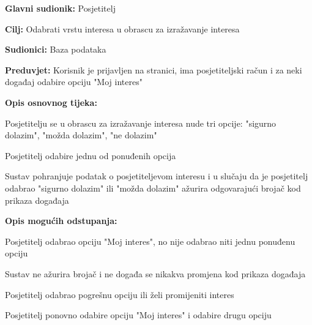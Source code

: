 					\noindent {}
\begin{packed_item}
	\item \textbf{Glavni sudionik:} Posjetitelj
	\item  \textbf{Cilj:} Odabrati vrstu interesa u obrascu za izražavanje interesa
	\item  \textbf{Sudionici:} Baza podataka
	\item  \textbf{Preduvjet:} Korisnik je prijavljen na stranici, ima posjetiteljski račun i za neki događaj odabire opciju "Moj interes"
	\item  \textbf{Opis osnovnog tijeka:}
	
	\item[] \begin{packed_enum}
		
		\item Posjetitelju se u obrascu za izražavanje interesa nude tri opcije: "sigurno dolazim", "možda dolazim", "ne dolazim"
		\item Posjetitelj odabire jednu od ponuđenih opcija
		\item Sustav pohranjuje podatak o posjetiteljevom interesu i u slučaju da je posjetitelj odabrao "sigurno dolazim" ili "možda dolazim" ažurira odgovarajući brojač kod prikaza događaja
	\end{packed_enum}
	
	\item  \textbf{Opis mogućih odstupanja:}
	
	\item[] \begin{packed_item}
		
		\item[2.a] Posjetitelj odabrao opciju "Moj interes", no nije odabrao niti jednu ponuđenu opciju
		\item[] \begin{packed_enum}
			
			\item Sustav ne ažurira brojač i ne događa se nikakva promjena kod prikaza događaja
			
		\end{packed_enum}
		\item[2.b] Posjetitelj odabrao pogrešnu opciju ili želi promijeniti interes
		\item[] \begin{packed_enum}
			
			\item Posjetitelj ponovno odabire opciju "Moj interes" i odabire drugu opciju
			
		\end{packed_enum}
		
	\end{packed_item}
\end{packed_item}

